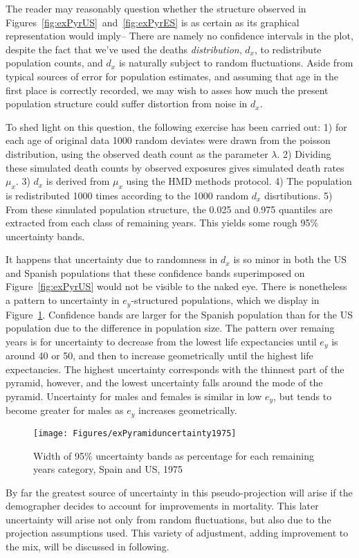 \FloatBarrier
\label{sec:structuncertainty}
The reader may reasonably question whether the structure observed in
Figures~\ref{fig:exPyrUS}~and~\ref{fig:exPyrES} is as certain as its graphical
representation would imply-- There are namely no confidence intervals in the
plot, despite the fact that we've used the deaths \textit{distribution}, $d_x$,
to redistribute population counts, and $d_x$ is naturally subject to random
fluctuations. Aside from typical sources of error for population estimates, and
assuming that age in the first place is correctly recorded, we may wish to asses
how much the present population structure could suffer distortion from noise in
$d_x$. 

To shed light on this question, the following exercise has been
carried out: 1) for each age of original data 1000 random deviates were drawn
from the poisson distribution, using the observed death count as the parameter
$\lambda$. 2) Dividing these simulated death counts by observed exposures gives
simulated death rates $\mu_x$. 3) $d_x$ is derived from $\mu_x$ using the HMD
methods protocol. 4) The population is redistributed 1000 times according to the
1000 random $d_x$ disrtibutions. 5) From these simulated population structure,
the 0.025 and 0.975 quantiles are extracted from each class of remaining years.
This yields some rough 95\% uncertainty bands.

It happens that uncertainty due to randomness in $d_x$ is so minor in both the
US and Spanish populations that these confidence bands superimposed on
Figure~\ref{fig:exPyrUS} would not be visible to the naked eye. There is
nonetheless a pattern to uncertainty in $e_y$-structured populations, 
which we display in Figure~\ref{fig:PyramidUncertainty}. Confidence bands are
larger for the Spanish population than for the US population due to
the difference in population size. The pattern over remaing years is for
uncertainty to decrease from the lowest life expectancies until $e_y$ is around 40 or 50, and then to
increase geometrically until the highest life expectancies. The highest
uncertainty corresponds with the thinnest part of the pyramid, however, and the
lowest uncertainty falls around the mode of the pyramid. Uncertainty for males
and females is similar in low $e_y$, but tends to become greater for males as
$e_y$ increases geometrically.

\begin{figure}
      \centering
      \caption{Width of 95\% uncertainty bands as percentage for each
      remaining years category, Spain and US, 1975}
         \texttt{[image: Figures/exPyramiduncertainty1975]}
      \label{fig:PyramidUncertainty} 
\end{figure}

By far the greatest source of uncertainty in this
pseudo-projection will arise if the demographer decides to account for
improvements in mortality. This later uncertainty will arise not only from
random fluctuations, but also due to the projection assumptions used. This
variety of adjustment, adding improvement to the mix, will be discussed in
following.

\FloatBarrier